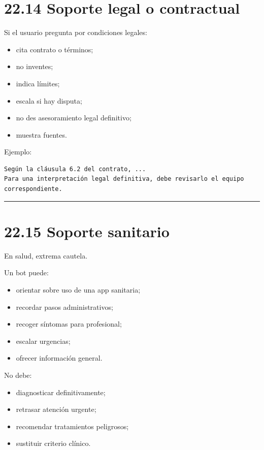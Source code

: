 \section{22.14 Soporte legal o
contractual}\label{soporte-legal-o-contractual}

Si el usuario pregunta por condiciones legales:

\begin{itemize}
\tightlist
\item
  cita contrato o términos;
\item
  no inventes;
\item
  indica límites;
\item
  escala si hay disputa;
\item
  no des asesoramiento legal definitivo;
\item
  muestra fuentes.
\end{itemize}

Ejemplo:

\begin{lstlisting}
Según la cláusula 6.2 del contrato, ...
Para una interpretación legal definitiva, debe revisarlo el equipo correspondiente.
\end{lstlisting}

\begin{center}\rule{0.5\linewidth}{0.5pt}\end{center}

\section{22.15 Soporte sanitario}\label{soporte-sanitario}

En salud, extrema cautela.

Un bot puede:

\begin{itemize}
\tightlist
\item
  orientar sobre uso de una app sanitaria;
\item
  recordar pasos administrativos;
\item
  recoger síntomas para profesional;
\item
  escalar urgencias;
\item
  ofrecer información general.
\end{itemize}

No debe:

\begin{itemize}
\tightlist
\item
  diagnosticar definitivamente;
\item
  retrasar atención urgente;
\item
  recomendar tratamientos peligrosos;
\item
  sustituir criterio clínico.
\end{itemize}

